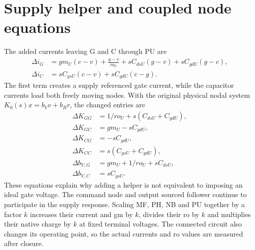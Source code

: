 \documentclass{article}
\begin{document}
\section*{Supply helper and coupled node equations}
The added currents leaving G and C through PU are
\begin{align}
\Delta i_G&=gm_U(c-v)+\frac{g-v}{ro_U}
 +sC_{dsU}(g-v)+sC_{gdU}(g-c),\\
\Delta i_C&=sC_{gsU}(c-v)+sC_{gdU}(c-g).
\end{align}
The first term creates a supply referenced gate current, while the
capacitor currents load both freely moving nodes. With the original
physical nodal system $K_0(s)x=b_Vv+b_Rr$, the changed entries are
\begin{align}
\Delta K_{GG}&=1/ro_U+s(C_{dsU}+C_{gdU}),\\
\Delta K_{GC}&=gm_U-sC_{gdU},\\
\Delta K_{CG}&=-sC_{gdU},\\
\Delta K_{CC}&=s(C_{gsU}+C_{gdU}),\\
\Delta b_{V,G}&=gm_U+1/ro_U+sC_{dsU},\\
\Delta b_{V,C}&=sC_{gsU}.
\end{align}
These equations explain why adding a helper is not equivalent to
imposing an ideal gate voltage. The command node and output sourced
follower continue to participate in the supply response.
Scaling MF, PH, NB and PU together by a factor $k$ increases their current
and gm by $k$, divides their ro by $k$ and multiplies their native charge
by $k$ at fixed terminal voltages.
The connected circuit also changes its operating point, so the actual
currents and ro values are measured after closure.
\end{document}
